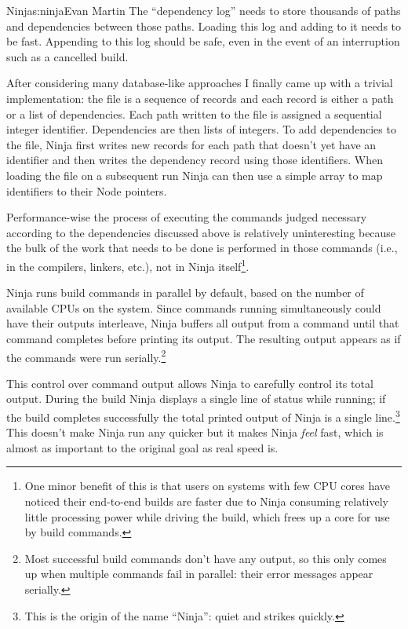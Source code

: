 \begin{aosachapter}{Ninja}{s:ninja}{Evan Martin}
The ``dependency log'' needs to store thousands of paths and
dependencies between those paths. Loading this log and adding to it
needs to be fast. Appending to this log should be safe, even in the
event of an interruption such as a cancelled build.

After considering many database-like approaches I finally came up with a
trivial implementation: the file is a sequence of records and each
record is either a path or a list of dependencies. Each path written to
the file is assigned a sequential integer identifier. Dependencies are
then lists of integers. To add dependencies to the file, Ninja first
writes new records for each path that doesn't yet have an identifier and
then writes the dependency record using those identifiers. When loading
the file on a subsequent run Ninja can then use a simple array to map
identifiers to their Node pointers.


Performance-wise the process of executing the commands judged necessary
according to the dependencies discussed above is relatively
uninteresting because the bulk of the work that needs to be done is
performed in those commands (i.e., in the compilers, linkers, etc.), not
in Ninja itself\footnote{One minor benefit of this is that users on
  systems with few CPU cores have noticed their end-to-end builds are
  faster due to Ninja consuming relatively little processing power while
  driving the build, which frees up a core for use by build commands.}.

Ninja runs build commands in parallel by default, based on the number of
available CPUs on the system. Since commands running simultaneously
could have their outputs interleave, Ninja buffers all output from a
command until that command completes before printing its output. The
resulting output appears as if the commands were run serially.\footnote{Most
  successful build commands don't have any output, so this only comes up
  when multiple commands fail in parallel: their error messages appear
  serially.}

This control over command output allows Ninja to carefully control its
total output. During the build Ninja displays a single line of status
while running; if the build completes successfully the total printed
output of Ninja is a single line.\footnote{This is the origin of the name
  ``Ninja'': quiet and strikes quickly.} This doesn't make Ninja run
any quicker but it makes Ninja \emph{feel} fast, which is almost as
important to the original goal as real speed is.


\end{aosachapter}
